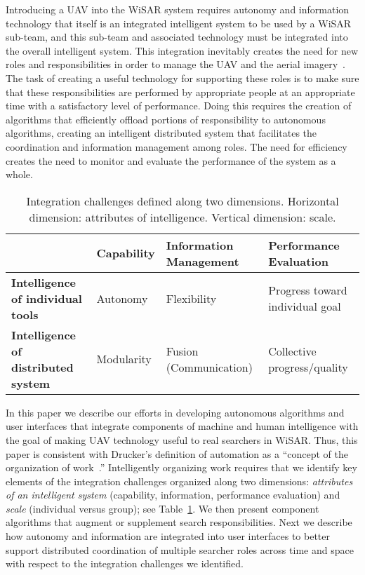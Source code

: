 \documentclass[letterpaper]{article}
\newcommand{\rr}{\raggedright}
\newcommand{\tn}{\tabularnewline}
\begin{document}
Introducing a UAV into the WiSAR system requires autonomy and information technology that itself is an integrated intelligent system to be used by a WiSAR sub-team, and this sub-team and associated technology must be integrated into the overall intelligent system. This integration inevitably creates the need for new roles and responsibilities in order to manage the UAV and the aerial imagery~\cite{adams2009cognitive,goodrich2007practices}. The task of creating a useful technology for supporting these roles is to make sure that these responsibilities are performed by appropriate people at an appropriate time with a satisfactory level of performance. Doing this requires the creation of algorithms that efficiently offload portions of responsibility to autonomous algorithms, creating an intelligent distributed system that facilitates the coordination and information management among roles. The need for efficiency creates the need to monitor and evaluate the performance of the system as a whole.

\begin{table}
\footnotesize
	\begin{center}
		\begin{tabular}{|p{1.85cm}|p{1.3cm}|p{1.8cm}|p{2.05cm}|}
			\hline
			 & \textbf{Capability} & \textbf{Information Management} & \textbf{Performance Evaluation} \\
			 \hline
			 \rr \textbf{Intelligence of individual tools} & Autonomy & Flexibility & Progress toward individual goal \tn
			 \hline
			 \rr \textbf{Intelligence of distributed system} & Modularity & Fusion (Communication) & Collective progress/quality \tn
			\hline
		\end{tabular}
	\end{center}
\caption{Integration challenges defined along two dimensions. Horizontal dimension: attributes of intelligence. Vertical dimension: scale.}
\label{dimensions}
\vspace*{-3ex}
\end{table}

In this paper we describe our efforts in developing autonomous algorithms and user interfaces that integrate components of machine and human intelligence with the goal of making UAV technology useful to real searchers in WiSAR. 
Thus, this paper is consistent with Drucker's definition of automation as a ``concept of the organization of work~\cite{drucker_practice_2006}.'' 
Intelligently organizing work requires that we identify key elements of the integration challenges organized along two dimensions: \textit{attributes of an intelligent system} (capability, information, performance evaluation) and \textit{scale} (individual versus group); see Table~\ref{dimensions}. We then present component algorithms  that augment or supplement search responsibilities. Next we describe how autonomy and information are integrated into user interfaces to better support distributed coordination of multiple searcher roles across time and space with respect to the integration challenges we identified.
\end{document}
